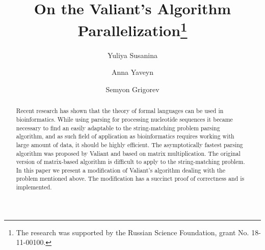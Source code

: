 \documentclass[runningheads]{llncs}
\begin{document}
%
\title{On the Valiant's Algorithm Parallelization\thanks{The research was supported by the Russian Science Foundation, grant No. 18-11-00100.}}
%
%
\author{Yuliya Susanina \and
Anna Yaveyn \and
Semyon Grigorev}
%
%
%
\maketitle              %
%
\begin{abstract}
Recent  research  has  shown  that the theory of formal languages can be used in bioinformatics. While using parsing for processing nucleotide sequences it became necessary to find an easily adaptable to the string-matching problem parsing algorithm, and as such field of application as bioinformatics requires working with large amount of data, it should be highly efficient. The asymptotically fastest parsing algorithm was proposed by Valiant and based on matrix multiplication. The original version of matrix-based algorithm is difficult to apply to the string-matching problem. In this paper we present  a modification  of Valiant's  algorithm dealing with the problem mentioned above. The modification has a succinct proof of correctness and is implemented.

\end{abstract}
%
%
%







%
%
%


\end{document}
